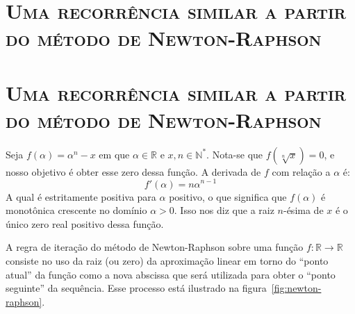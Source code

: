 \documentclass{article}
\let \sectionBkp = \section
\newcommand{\sectionFormatter}[1]{
    \centering\large\textbf{\textsc{#1}}}
\renewcommand{\section}[2]
    {\ifthenelse{\equal{#1}{*}}
        {\sectionBkp*{\sectionFormatter{#2}}}
        {\sectionBkp{\sectionFormatter{#2}}}
    }
\begin{document}
\section*{Uma recorrência similar a partir do método de Newton-Raphson}

Seja $f(\alpha) = \alpha^n - x$
em que $\alpha \in \mathds{R}$ e $x, n \in \mathds{N}^*$.
Nota-se que $f(\sqrt[n]{x}) = 0$,
e nosso objetivo é obter esse zero dessa função.
A derivada de $f$ com relação a $\alpha$ é:
\[f'(\alpha) = n \alpha^{n-1}\]
A qual é estritamente positiva para $\alpha$ positivo,
o que significa que $f(\alpha)$ é monotônica crescente
no domínio $\alpha > 0$.
Isso nos diz que a raiz $n$-ésima de $x$
é o único zero real positivo dessa função.

A regra de iteração do método de Newton-Raphson
sobre uma função $f:\mathds{R}\to\mathds{R}$
consiste no uso da raiz (ou zero)
da aproximação linear em torno do ``ponto atual'' da função
como a nova abscissa que será utilizada
para obter o ``ponto seguinte'' da sequência.
Esse processo está ilustrado na figura~\ref{fig:newton-raphson}.
\end{document}
